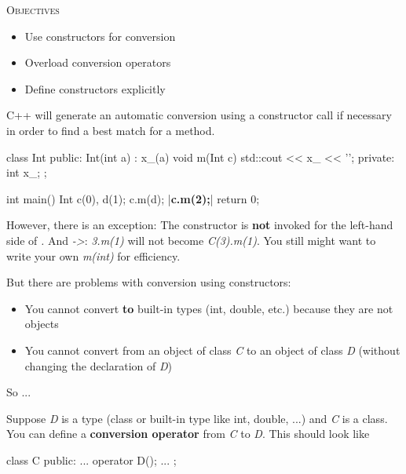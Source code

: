 \newpage{}

\textsc{Objectives}
\begin{itemize}
\item Use constructors for conversion
\item Overload conversion operators
\item Define constructors explicitly
\end{itemize}


\newpage{}

C++ will generate an automatic conversion using a constructor call if
necessary in order to find a best match for a method.

\begin{consolethree}[escapeinside=||]
class Int
{
public:
    Int(int a)
        : x_(a)
    {}
    void m(Int c) { std::cout << x_ << '\n'; }
private:
    int x_;
};
\end{consolethree}

\begin{consolethree}[escapeinside=||]
int main()
{
    Int c(0), d(1);
    c.m(d);
    |{\bf c.m(2);}|
    return 0;
}
\end{consolethree}

However, there is an exception: The constructor is \textbf{not} invoked
for the left-hand side of \textit{.} And \textit{->}:
\textit{3.m(1)} will not become \textit{C(3).m(1)}. You still might want to
write your own \textit{m(int)} for efficiency.

But there are problems with conversion using constructors:

\begin{itemize}
\item You cannot convert \textbf{to} built-in types (int, double, etc.)
  because they are not objects
\item You cannot convert from an object of class \textit{C} to an object of
  class \textit{D} (without changing the declaration of \textit{D})
\end{itemize}

So ...


\newpage{}

Suppose \textit{D} is a type (class or built-in type like int, double,
...) and \textit{C} is a class. You can define a \textbf{conversion
operator} from \textit{C} to \textit{D}. This should look like

\begin{consolethree}[escapeinside=||]
class C
{
public:
    ...
    operator D();
    ...
};
\end{consolethree}

